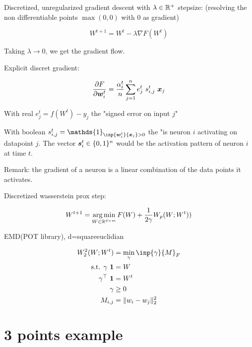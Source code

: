 Discretized, unregularized gradient descent with $\lambda \in \mathbb{R}^+$ stepsize: (resolving the non differentiable points $\max(0, 0)$ with 0 as gradient)

\begin{equation}
	W^{t+1} = W^t - \lambda \nabla F(W^t)
\end{equation}

Taking $\lambda \rightarrow 0$, we get the gradient flow.

Explicit discret gradient:

\begin{equation}
	\frac{\partial F}{\partial {\bm{w}}^t_i} = \frac{\alpha^t_i}{n} \sum_{j=1}^{n} e^t_j ~ s^t_{i, j} ~ {\bm{x}}_j
\end{equation}

With real $e^t_j = f(W^t) - y_j$ the "signed error on input $j$"

With boolean $s^t_{i, j} = \mathds{1}_{\inp{\vw^t_i}{\vx_j} > 0}$ the "is neuron $i$ activating on datapoint $j$. The vector ${\bm{s}}^t_{i} \in \{0, 1\}^n$ would be the activation pattern of neuron $i$ at time $t$.

Remark: the gradient of a neuron is a linear combination of the data points it activates.

Discretized wasserstein prox step:

\begin{equation}
	W^{t+1} = \operatorname*{arg\,min}_{W \in \mathbb{R}^{d \times m}} F(W) + \frac{1}{2 \gamma} W_p(W; W^t))
\end{equation}


EMD(POT library), d=squareeuclidian

\begin{align}
	W_2^2(W; W^t) &= \min_{\gamma} \inp{\gamma}{M}_F \\
	\text{s.t.  } \gamma ~ \mathbf{1} &= W \\
	\gamma^\top ~ \mathbf{1} &= W^t \\
	\gamma &\geq 0 \\
	M_{i, j} &= \lVert w_i - w_j \rVert^2_2
\end{align}

\section{3 points example}

